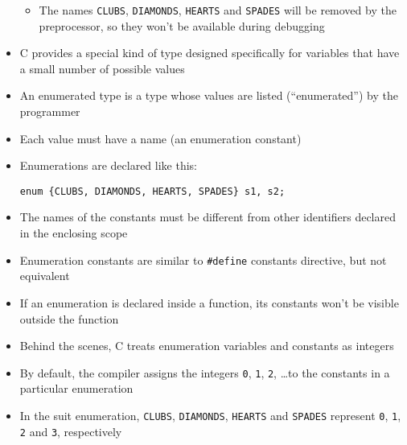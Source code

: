 \documentclass{article}
\begin{document}
\begin{itemize}
\begin{itemize}
\item The names \verb!CLUBS!, \verb!DIAMONDS!, \verb!HEARTS! and \verb!SPADES! will be removed by the preprocessor, so they won't be available during debugging
\end{itemize}

\item C provides a special kind of type designed specifically for variables that have a small number of possible values

\item An enumerated type is a type whose values are listed (``enumerated'') by the programmer

\item Each value must have a name (an enumeration constant)

\item Enumerations are declared like this:
\begin{verbatim}
enum {CLUBS, DIAMONDS, HEARTS, SPADES} s1, s2;
\end{verbatim}
\item The names of the constants must  be different from other identifiers declared in the enclosing scope
\item Enumeration constants are similar to \verb!#define! constants directive, but not equivalent
\item If an enumeration is declared inside a function, its constants won't be visible outside the function

\item Behind the scenes, C treats enumeration variables and constants as integers

\item By default, the compiler assigns the integers \verb!0!, \verb!1!, \verb!2!, \ldots to the constants in a particular enumeration

\item In the suit enumeration, \verb!CLUBS!, \verb!DIAMONDS!, \verb!HEARTS! and \verb!SPADES! represent \verb!0!, \verb!1!, \verb!2! and \verb!3!, respectively
\end{itemize}
\end{document}
